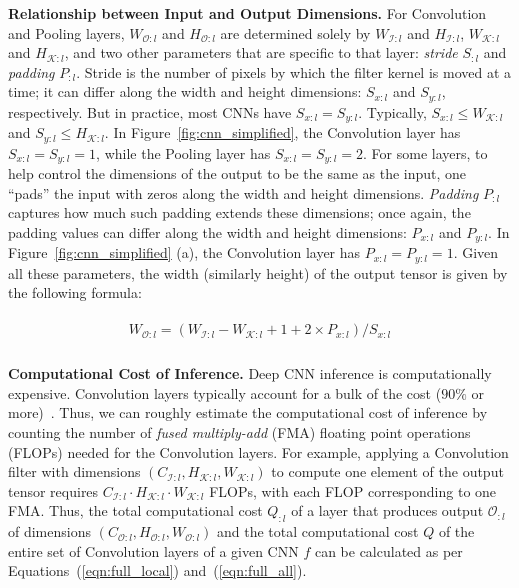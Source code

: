 \vspace{2mm}
\noindent \textbf{Relationship between Input and Output Dimensions.}
For Convolution and Pooling layers, $W_{\mathcal{O}:l}$ and $H_{\mathcal{O}:l}$ are determined solely by $W_{\mathcal{I}:l}$ and $H_{\mathcal{I}:l}$, $W_{\mathcal{K}:l}$ and $H_{\mathcal{K}:l}$, and two other parameters that are specific to that layer: \textit{stride} $S_{:l}$ and \textit{padding} $P_{:l}$. Stride is the number of pixels by which the filter kernel is moved at a time; it can differ along the width and height dimensions: $S_{x:l}$ and $S_{y:l}$, respectively. But in practice, most CNNs have $S_{x:l} = S_{y:l}$. Typically, $S_{x:l} \leq W_{\mathcal{K}:l}$ and $S_{y:l} \leq H_{\mathcal{K}:l}$. In Figure~\ref{fig:cnn_simplified}, the Convolution layer has $S_{x:l} = S_{y:l} = 1$, while the Pooling layer has $S_{x:l} = S_{y:l} = 2$. For some layers, to help control the dimensions of the output to be the same as the input, one ``pads'' the input with zeros along the width and height dimensions. \textit{Padding} $P_{:l}$ captures how much such padding extends these dimensions; once again, the padding values can differ along the width and height dimensions: $P_{x:l}$ and $P_{y:l}$. In Figure~\ref{fig:cnn_simplified} (a), the Convolution layer has $P_{x:l} = P_{y:l} = 1$. Given all these parameters, the width (similarly height) of the output tensor is given by the following formula:

\vspace{-4mm}
\begin{align}
\begin{split}
W_{\mathcal{O}:l} = (W_{\mathcal{I}:l} - W_{\mathcal{K}:l} + 1 + 2\times P_{x:l})/S_{x:l} \\
\end{split}
\end{align}

\vspace{2mm}
\noindent \textbf{Computational Cost of Inference.}
Deep CNN inference is computationally expensive. Convolution layers typically account for a bulk of the cost ($90\%$ or more)~\cite{cavigelli2017cbinfer}. Thus, we can roughly estimate the computational cost of inference by counting the number of \textit{fused multiply-add} (FMA) floating point operations (FLOPs) needed for the Convolution layers.
For example, applying a Convolution filter with dimensions $(C_{\mathcal{I}:l} , H_{\mathcal{K}:l} , W_{\mathcal{K}:l})$ to compute one element of the output tensor requires $C_{\mathcal{I}:l} \cdot H_{\mathcal{K}:l} \cdot  W_{\mathcal{K}:l}$ FLOPs, with each FLOP corresponding to one FMA. Thus, the total computational cost $Q_{:l}$ of a layer that produces output $\mathcal{O}_{:l}$ of dimensions $(C_{\mathcal{O}:l} , H_{\mathcal{O}:l} , W_{\mathcal{O}:l})$ and the total computational cost $Q$ of the entire set of Convolution layers of a given CNN $f$ can be calculated as per Equations~(\ref{eqn:full_local}) and~(\ref{eqn:full_all}).


